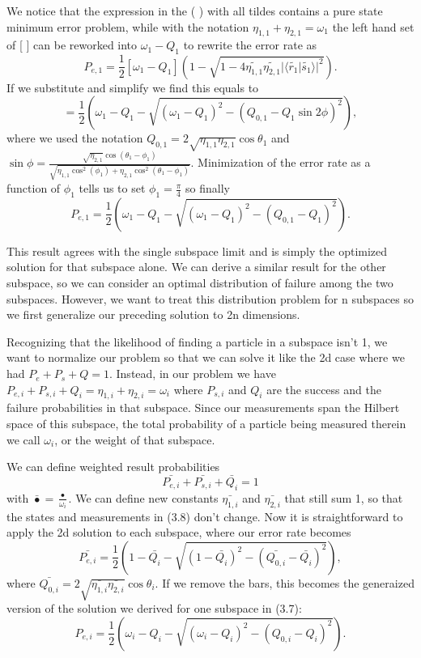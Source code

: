 \documentclass[12pt,oneside,english,reqno]{amsbook}
\numberwithin{section}{chapter}
\numberwithin{equation}{section}
\numberwithin{figure}{section}
\begin{document}
We notice that the expression in the ( ) with all tildes contains a pure state minimum error problem, while with the notation $ \eta_{1,1} +\eta_{2,1} = \omega_1$ the left hand set of [ ]  can be reworked into $\omega_1 - Q_1 $ to rewrite the error rate as
\[ P_{e,1}= \frac{1}{2} [\omega_1 - Q_1] (1- \sqrt{1 - 4 \widetilde{\eta_{1,1}} \widetilde{\eta_{2,1}} \vert \langle \widetilde{r_1} \vert \widetilde{s_1} \rangle \vert ^2 }). \]
If we substitute and simplify we find this equals to
\[=\frac{1}{2} ( \omega_1 - Q_1 - \sqrt{ ( \omega_1 - Q_1)^2 -(Q_{0,1} - Q_1 \sin 2 \phi )^2}),\]
where we used the notation $Q_{0,1} = 2 \sqrt{\eta_{1,1}\eta_{2,1}} \cos \theta_1$ and 
 $ \sin \phi = \frac{ \sqrt {\eta_{2,1}} \cos (\theta_1 - \phi_1)}{\sqrt{ \eta_{1,1} \cos^2 (\phi_1)+ \eta_{2,1} \cos^2 (\theta_1 - \phi_1)}}$.  Minimization of the error rate as a function of $\phi_1$ tells us to set $\phi_1 =\frac{\pi}{4}$ so finally
\begin{equation}P_{e,1} = \frac{1}{2} ( \omega_1 - Q_1 - \sqrt{ ( \omega_1 - Q_1)^2 -(Q_{0,1} - Q_1 )^2}).\end{equation}

This result agrees with the single subspace limit and is simply the optimized solution for that subspace alone. We can derive a similar result for the other subspace, so we can consider an optimal distribution of failure among the two subspaces.  However, we want to treat this distribution problem for n subspaces so we first generalize our preceding solution to 2n dimensions.


Recognizing that the likelihood of finding a particle in a subspace isn't 1, we want to normalize our problem so that we can solve it like the 2d case where we had $P_e+ P_s+ Q= 1.$ Instead, in our problem we have $P_{e,i} + P_{s,i} + Q_i = \eta_{1,i} + \eta_{2,i} = \omega_i$ where $P_{s,i}$ and $Q_i$ are the success and the failure probabilities in that subspace.  Since our measurements span the Hilbert space of this subspace, the total probability of a particle being measured therein we call $\omega_i$, or the weight of that subspace.

We can define weighted result probabilities
\begin{equation} \bar{P_{e,i}} +\bar{P_{s,i}} + \bar{Q_i} = 1 \end{equation}
with $ \bar{\bullet} = \frac{\bullet}{\omega_i} $. We can define new constants $\bar{\eta_{1,i}} $ and $ \bar{\eta_{2,i}}$ that still sum 1, so that the states and measurements in (3.8) don't change.  Now it is straightforward to apply the 2d solution to each subspace, where our error rate becomes
\[\bar{P_{e,i}} = \frac{1}{2}( 1-\bar{Q_i} - \sqrt{(1-\bar{Q_i})^2 - (\bar{Q_{0,i}} -\bar{ Q_i})^2}),\]
where $\bar{Q_{0,i}} = 2 \sqrt{\bar{\eta_{1,i}}\bar{\eta_{2,i}}}\cos\theta_i.$
If we remove the bars, this becomes the generaized version of the solution we derived for one subspace in (3.7):
\begin{equation}P_{e,i}= \frac{1}{2}( \omega_i-Q_i - \sqrt{(\omega_i-Q_i)^2 - (Q_{0,i} - Q_i)^2}).\end{equation}
\end{document}
